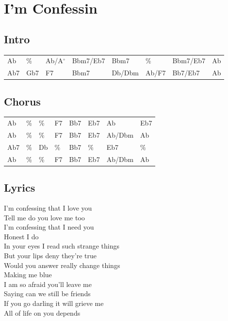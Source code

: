 \section{I'm Confessin}


\subsection*{Intro}


\begin{tabular}{l l l l l l l l}
Ab & \% & Ab/A$^{\circ}$ & Bbm7/Eb7 & Bbm7 & \% & Bbm7/Eb7 & Ab \\ 
Ab7 & Gb7 & F7 & Bbm7 & Db/Dbm & Ab/F7 & Bb7/Eb7 & Ab \\ 
\end{tabular}


\subsection*{Chorus}


\begin{tabular}{l l l l l l l l}
Ab & \% & \% & F7 & Bb7 & Eb7 & Ab & Eb7 \\ 
Ab & \% & \% & F7 & Bb7 & Eb7 & Ab/Dbm & Ab \\ 
Ab7 & \% & Db & \% & Bb7 & \% & Eb7 & \% \\ 
Ab & \% & \% & F7 & Bb7 & Eb7 & Ab/Dbm & Ab \\ 
\end{tabular}


\subsection*{Lyrics}


I'm confessing that I love you \\ 
Tell me do you love me too \\ 
I'm confessing that I need you \\ 
Honest I do \\ 

In your eyes I read such strange things \\ 
But your lips deny they're true \\ 
Would you answer really change things \\ 
Making me blue \\ 

I am so afraid you'll leave me \\ 
Saying can we still be friends \\ 
If you go darling it will grieve me \\ 
All of life on you depends \\ 

